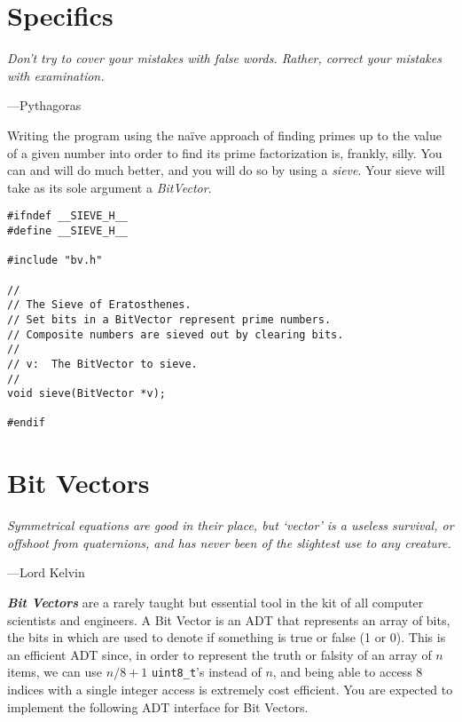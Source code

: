 \documentclass[11pt,twocolumn]{article}
\begin{document}
\section{Specifics}
\epigraph{\emph{Don't try to cover your mistakes with false words. Rather,
correct your mistakes with examination.}}{---Pythagoras}

Writing the program using the na\"ive approach of finding primes
up to the value of a given number into order to find its prime
factorization is, frankly, silly. You can and will do much better,
and you will do so by using a \emph{sieve}. Your sieve will take as its sole
argument a \emph{BitVector}.

\begin{lstlisting}[title=sieve.h]
#ifndef __SIEVE_H__
#define __SIEVE_H__

#include "bv.h"

//
// The Sieve of Eratosthenes.
// Set bits in a BitVector represent prime numbers.
// Composite numbers are sieved out by clearing bits.
//
// v:  The BitVector to sieve.
//
void sieve(BitVector *v);

#endif
\end{lstlisting}


\section{Bit Vectors}
\epigraph{\emph{Symmetrical equations are good in their place, but `vector'
is a useless survival, or offshoot from quaternions, and has never been of the
slightest use to any creature.}}{---Lord Kelvin}

\textit{\textbf{Bit Vectors}} are a rarely taught but essential tool in the kit
of all computer scientists and engineers. A Bit Vector is an ADT that represents
an array of bits, the bits in which are used to denote if something is true or
false (1 or 0). This is an efficient ADT since, in order to represent the truth
or falsity of an array of $n$ items, we can use $n / 8 + 1$ \texttt{uint8\_t}'s
instead of $n$, and being able to access $8$ indices with a single integer
access is extremely cost efficient. You are expected to implement the following
ADT interface for Bit Vectors.
\end{document}
